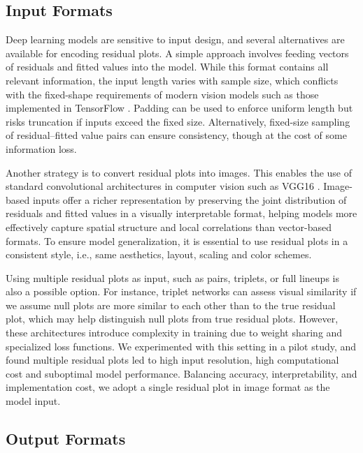 \documentclass[]{interact}
\theoremstyle{plain}%
\theoremstyle{definition}
\theoremstyle{remark}
\begin{document}
\subsection{Input Formats}\label{input-formats}

Deep learning models are sensitive to input design, and several
alternatives are available for encoding residual plots. A simple
approach involves feeding vectors of residuals and fitted values into
the model. While this format contains all relevant information, the
input length varies with sample size, which conflicts with the
fixed-shape requirements of modern vision models such as those
implemented in TensorFlow \citep{abadi2016tensorflow}. Padding can be
used to enforce uniform length but risks truncation if inputs exceed the
fixed size. Alternatively, fixed-size sampling of residual--fitted value
pairs can ensure consistency, though at the cost of some information
loss.

Another strategy is to convert residual plots into images. This enables
the use of standard convolutional architectures in computer vision such
as VGG16 \citep{simonyan2014very}. Image-based inputs offer a richer
representation by preserving the joint distribution of residuals and
fitted values in a visually interpretable format, helping models more
effectively capture spatial structure and local correlations than
vector-based formats. To ensure model generalization, it is essential to
use residual plots in a consistent style, i.e., same aesthetics, layout,
scaling and color schemes.

Using multiple residual plots as input, such as pairs, triplets, or full
lineups is also a possible option. For instance, triplet networks
\citep{chopra2005learning} can assess visual similarity if we assume
null plots are more similar to each other than to the true residual
plot, which may help distinguish null plots from true residual plots.
However, these architectures introduce complexity in training due to
weight sharing and specialized loss functions. We experimented with this
setting in a pilot study, and found multiple residual plots led to high
input resolution, high computational cost and suboptimal model
performance. Balancing accuracy, interpretability, and implementation
cost, we adopt a single residual plot in image format as the model
input.

\subsection{Output Formats}\label{output-formats}
\end{document}
